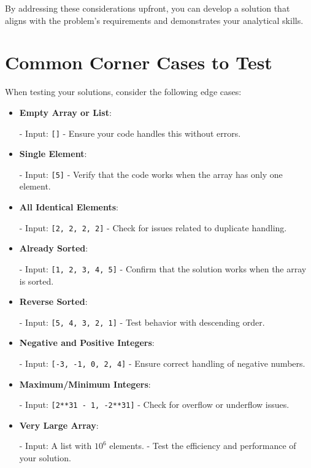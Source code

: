 By addressing these considerations upfront, you can develop a solution that aligns with the problem's requirements and demonstrates your analytical skills.

\section{Common Corner Cases to Test}\label{sec:corner_cases}

When testing your solutions, consider the following edge cases:

\begin{itemize}
    \item \textbf{Empty Array or List}:

    - Input: \texttt{[]}
    - Ensure your code handles this without errors.

    \item \textbf{Single Element}:

    - Input: \texttt{[5]}
    - Verify that the code works when the array has only one element.

    \item \textbf{All Identical Elements}:

    - Input: \texttt{[2, 2, 2, 2]}
    - Check for issues related to duplicate handling.

    \item \textbf{Already Sorted}:

    - Input: \texttt{[1, 2, 3, 4, 5]}
    - Confirm that the solution works when the array is sorted.

    \item \textbf{Reverse Sorted}:

    - Input: \texttt{[5, 4, 3, 2, 1]}
    - Test behavior with descending order.

    \item \textbf{Negative and Positive Integers}:

    - Input: \texttt{[-3, -1, 0, 2, 4]}
    - Ensure correct handling of negative numbers.

    \item \textbf{Maximum/Minimum Integers}:

    - Input: \texttt{[2**31 - 1, -2**31]}
    - Check for overflow or underflow issues.

    \item \textbf{Very Large Array}:

    - Input: A list with \(10^6\) elements.
    - Test the efficiency and performance of your solution.

\end{itemize}

